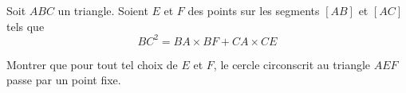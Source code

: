 Soit $ABC$ un triangle. Soient $E$ et $F$ des points sur les segments $[AB]$ et $[AC]$ tels que
$$BC^2 = BA\times BF + CA \times CE$$

Montrer que pour tout tel choix de $E$ et $F$, le cercle circonscrit au triangle $AEF$ passe par un point fixe.